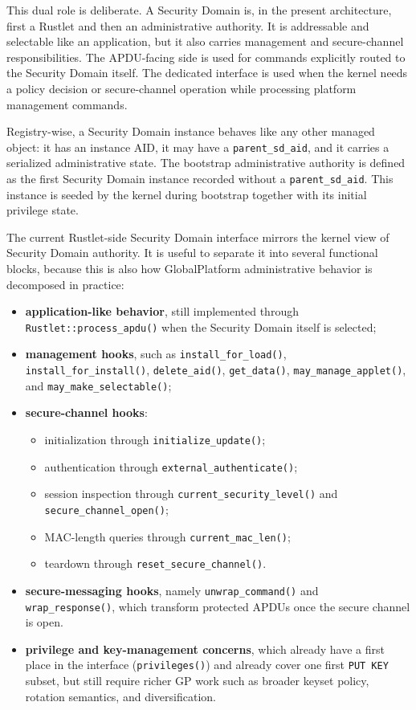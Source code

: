 This dual role is deliberate. A Security Domain is, in the present
architecture, first a Rustlet and then an administrative authority. It is
addressable and selectable like an application, but it also carries
management and secure-channel responsibilities. The APDU-facing side is
used for commands explicitly routed to the Security Domain itself. The
dedicated interface is used when the kernel needs a policy decision or
secure-channel operation while processing platform management commands.

Registry-wise, a Security Domain instance behaves like any other managed
object: it has an instance AID, it may have a \texttt{parent\_sd\_aid}, and it
carries a serialized administrative state. The bootstrap administrative
authority is defined as the first Security Domain instance recorded without a
\texttt{parent\_sd\_aid}. This instance is seeded by the kernel during
bootstrap together with its initial privilege state.

The current Rustlet-side Security Domain interface mirrors the kernel
view of Security Domain authority. It is useful to separate it into
several functional blocks, because this is also how GlobalPlatform
administrative behavior is decomposed in practice:
\begin{itemize}
\item \textbf{application-like behavior}, still implemented through
  \texttt{Rustlet::process\_apdu()} when the Security Domain itself is
  selected;
\item \textbf{management hooks}, such as
  \texttt{install\_for\_load()},
  \texttt{install\_for\_install()}, \texttt{delete\_aid()},
  \texttt{get\_data()}, \texttt{may\_manage\_applet()}, and
  \texttt{may\_make\_selectable()};
\item \textbf{secure-channel hooks}:
  \begin{itemize}
  \item initialization through \texttt{initialize\_update()};
  \item authentication through \texttt{external\_authenticate()};
  \item session inspection through \texttt{current\_security\_level()} and
    \texttt{secure\_channel\_open()};
  \item MAC-length queries through \texttt{current\_mac\_len()};
  \item teardown through \texttt{reset\_secure\_channel()}.
  \end{itemize}
\item \textbf{secure-messaging hooks}, namely
  \texttt{unwrap\_command()} and \texttt{wrap\_response()}, which
  transform protected APDUs once the secure channel is open.
\item \textbf{privilege and key-management concerns}, which already have
  a first place in the interface (\texttt{privileges()}) and already
  cover one first \texttt{PUT KEY} subset, but still require richer GP
  work such as broader keyset policy, rotation semantics, and
  diversification.
\end{itemize}

